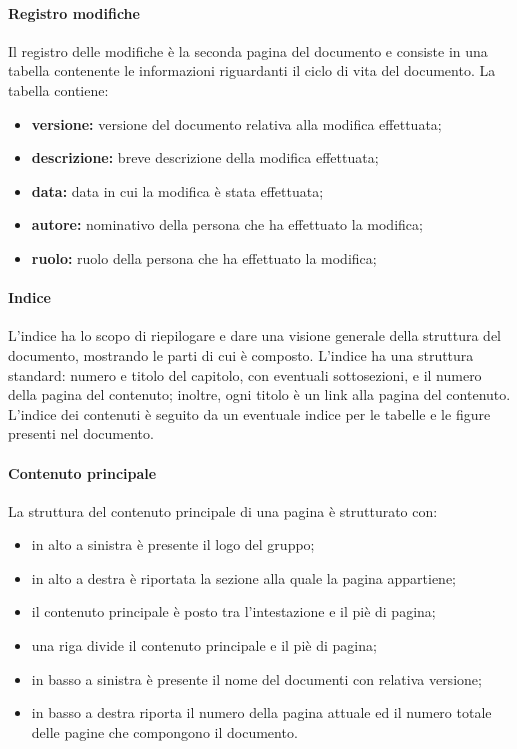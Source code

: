 			\paragraph{Registro modifiche}
			\label{par: Registro modifiche}
				Il registro delle modifiche è la seconda pagina del documento e consiste in una tabella contenente le informazioni riguardanti il ciclo di vita del documento. La tabella contiene:
				\begin{itemize}
					\item \textbf{versione:} versione del documento relativa alla modifica effettuata;
					\item \textbf{descrizione:} breve descrizione della modifica effettuata;
					\item \textbf{data:} data in cui la modifica è stata effettuata;
					\item \textbf{autore:} nominativo della persona che ha effettuato la modifica;
					\item \textbf{ruolo:} ruolo della persona che ha effettuato la modifica;
				\end{itemize}
			\paragraph{Indice}
				L'indice ha lo scopo di riepilogare e dare una visione generale della struttura del documento, mostrando le parti di cui è composto. L'indice ha una struttura standard: numero e titolo del capitolo, con eventuali sottosezioni, e il numero della pagina del contenuto; inoltre, ogni titolo è un link alla pagina del contenuto. L'indice dei contenuti è seguito da un eventuale indice per le tabelle e le figure presenti nel documento.
			\paragraph{Contenuto principale}
				La struttura del contenuto principale di una pagina è strutturato con:
					\begin{itemize}
						\item in alto a sinistra è presente il logo del gruppo;
						\item in alto a destra è riportata la sezione alla quale la pagina appartiene;
						\item il contenuto principale è posto tra l'intestazione e il piè di pagina;
						\item una riga divide il contenuto principale e il piè di pagina;
						\item in basso a sinistra è presente il nome del documenti con relativa versione;
						\item in basso a destra riporta il numero della pagina attuale ed il numero totale delle pagine che compongono il documento.
					\end{itemize}

